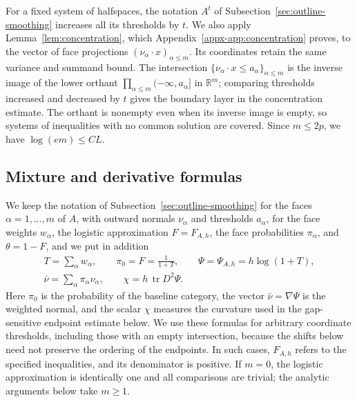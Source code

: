 \documentclass[11pt,letterpaper]{article}
\newif\ifshowrev
\newcommand{\rs}[1]{\ifshowrev{\color{revblue}#1}\else#1\fi}
\newif\ifshowpass
\newcommand{\pass}[1]{\ifshowpass{\color{revblue}%
\hypersetup{linkcolor=revblue,citecolor=revblue,urlcolor=revblue}#1}\else#1\fi}
\newif\ifshowtrim
\newcommand{\trim}[1]{\ifshowtrim{\color{revblue}%
\hypersetup{linkcolor=revblue,citecolor=revblue,urlcolor=revblue}#1}\else#1\fi}
\newcommand{\trs}[1]{\ifshowtrim{\color{revblue}#1}\else#1\fi}
\newif\ifshowskill
\newcommand{\skl}[1]{\ifshowskill{\color{revblue}%
\hypersetup{linkcolor=revblue,citecolor=revblue,urlcolor=revblue}#1}\else#1\fi}
\theoremstyle{remark}
\newcommand{\R}{\mathbb R}
\newcommand{\tr}{\operatorname{tr}}
\begin{document}
\trim{For} a fixed system of halfspaces\trim{, the notation
\(A^{\rs t}\) of Subsection~\ref{sec:outline-smoothing}} increases all its
thresholds by \(\rs t\). We also apply \trim{Lemma~\ref{lem:concentration},
which Appendix~\ref{appx-app:concentration} proves,} to the
\trim{vector of face projections}
\((\nu_\alpha\cdot x)_{\alpha\le m}\). Its coordinates retain
the same variance and summand bound. The intersection
\(\{\nu_\alpha\cdot x\le a_\alpha\}_{\alpha\le m}\) is the inverse
image of the lower orthant \(\prod_{\alpha\le m}(-\infty,a_\alpha]\)
in \(\R^m\); comparing thresholds increased and decreased by \(\rs t\)
gives the \skl{boundary layer} in the concentration estimate. The orthant \pass{is} nonempty even when
its inverse image is empty, so \trim{systems of inequalities with no
common solution} are covered. Since \(m\le2p\), \pass{we have} \(\log(em)\le CL\).

\subsection{\texorpdfstring{\trs{Mixture and derivative formulas}}{Mixture and derivative formulas}}\label{appx-sec:mixture}

\trim{We keep the notation of Subsection~\ref{sec:outline-smoothing} for
the faces \(\alpha=1,\ldots,m\) of \(A\), with \trim{outward} normals
\(\nu_\alpha\) and thresholds \(a_\alpha\), for the face weights
\(w_\alpha\), the logistic approximation \(F=F_{A,h}\), the face
probabilities \(\pi_\alpha\), and \(\theta=1-F\), and we put in
addition}
\begin{gather*}
 \trs{T=\sum_\alpha w_\alpha,\qquad \pi_0=F=\frac1{1+T},\qquad
 \Psi=\Psi_{A,h}=h\log(1+T),}\\
 \rs{\bar\nu}=\sum_\alpha\pi_\alpha\nu_\alpha,
 \qquad \chi=h\,\tr D^2\Psi.
\end{gather*}
\trim{Here \(\pi_0\) is the probability of the baseline category, the
vector} \(\rs{\bar\nu}=\nabla\Psi\) is \trim{the} weighted normal\trim{, and}
the scalar \(\chi\) measures the curvature used in the gap-sensitive
endpoint estimate below. We use \trim{these formulas} for arbitrary
coordinate thresholds, including those with an empty intersection,
because the shifts below need not preserve the ordering of the
endpoints. In such cases, \(F_{A,h}\) refers to the specified
inequalities, and its denominator is positive. If \(m=0\), the logistic
approximation is identically one and all comparisons are trivial; the
analytic arguments below take \(m\ge1\).
\end{document}
